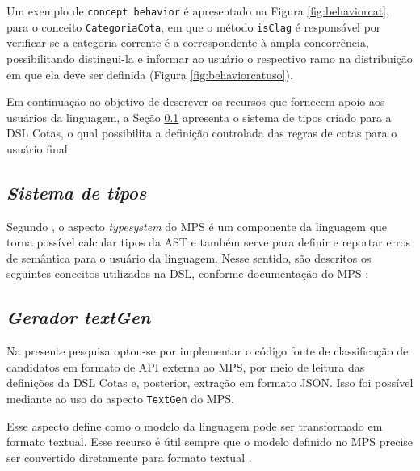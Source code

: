 \newpage
Um exemplo de \texttt{concept behavior} é apresentado na Figura \ref{fig:behaviorcat}, para o conceito \texttt{CategoriaCota}, em que o método \texttt{isClag} é responsável por verificar se a categoria corrente é a correspondente à ampla concorrência, possibilitando distingui-la e informar ao usuário o respectivo ramo na distribuição em que ela deve ser definida (Figura \ref{fig:behaviorcatuso}).





\newpage
Em continuação ao objetivo de descrever os recursos que fornecem apoio aos usuários da linguagem, a Seção \ref{sub:sec:typesystem} apresenta o sistema de tipos criado para a DSL Cotas, o qual possibilita a definição controlada das regras de cotas para o usuário final.


\subsection{\textit{Sistema de tipos}}
\label{sub:sec:typesystem}

Segundo , o aspecto \textit{typesystem} do \gls{MPS} é um componente da linguagem que torna possível calcular tipos da \gls{AST} e também serve para definir e reportar erros de semântica para o usuário da linguagem. Nesse sentido, são descritos os seguintes conceitos utilizados na DSL, conforme documentação do \gls{MPS} :





\newpage
\subsection{\textit{Gerador textGen}}
\label{sub:sec:texgen}

Na presente pesquisa optou-se por implementar o código fonte de classificação de candidatos em formato de \gls{API} externa ao \gls{MPS}, por meio de leitura das definições da DSL Cotas e, posterior, extração em formato JSON. Isso foi possível mediante ao uso do aspecto \texttt{TextGen} do MPS.

Esse aspecto define como o modelo da linguagem pode ser transformado em formato textual. Esse recurso é útil sempre que o modelo definido no MPS precise ser convertido diretamente para formato textual \cite{jetbrains}. 

